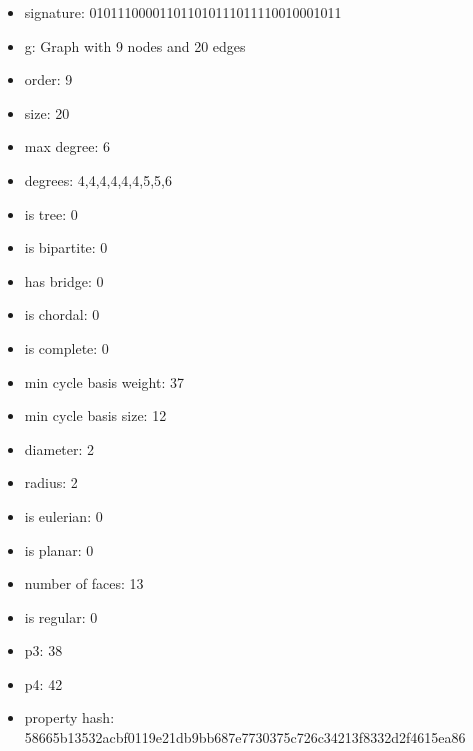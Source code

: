 \newpage
\begin{figure}
\end{figure}
\begin{itemize}
\item signature: 010111000011011010111011110010001011
\item g: Graph with 9 nodes and 20 edges
\item order: 9
\item size: 20
\item max degree: 6
\item degrees: 4,4,4,4,4,4,5,5,6
\item is tree: 0
\item is bipartite: 0
\item has bridge: 0
\item is chordal: 0
\item is complete: 0
\item min cycle basis weight: 37
\item min cycle basis size: 12
\item diameter: 2
\item radius: 2
\item is eulerian: 0
\item is planar: 0
\item number of faces: 13
\item is regular: 0
\item p3: 38
\item p4: 42
\item property hash: 58665b13532acbf0119e21db9bb687e7730375c726c34213f8332d2f4615ea86
\end{itemize}
